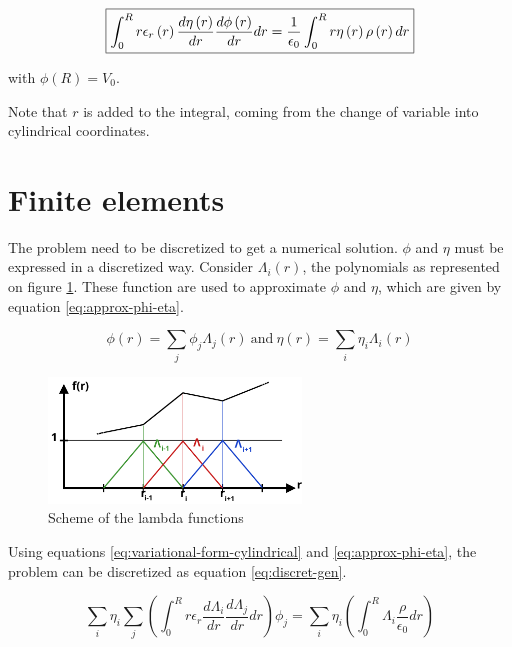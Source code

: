 \documentclass[a4paper,12pt,twoside]{article}
\newcommand{\bracket}[1]{\left(#1\right)}
\begin{document}
    \begin{equation}
      \centering
      \boxed{\int_0^R r\epsilon_r\bracket{r}\frac{d\eta\bracket{r}}{dr}\frac{d\phi\bracket{r}}{dr}dr = \frac{1}{\epsilon_0}\int_0^R r\eta\bracket{r}\rho\bracket{r} dr}
      \label{eq:variational-form-cylindrical}
    \end{equation}

    with $\phi\bracket{R} = V_0$.

    Note that $r$ is added to the integral, coming from the change of variable into cylindrical coordinates.

\section{Finite elements}
  The problem need to be discretized to get a numerical solution.
  $\phi$ and $\eta$ must be expressed in a discretized way.
  Consider $\Lambda_i\bracket{r}$, the polynomials as represented on figure \ref{fig:lambda}.
  These function are used to approximate $\phi$ and $\eta$, which are given by equation \eqref{eq:approx-phi-eta}.

  \begin{equation}
    \phi\bracket{r}=\sum_j\phi_j\Lambda_j\bracket{r}~\text{and}~\eta\bracket{r}=\sum_i\eta_i\Lambda_i\bracket{r}
    \label{eq:approx-phi-eta} %
  \end{equation}

  \begin{figure}[h]
    \centering
    \includegraphics[width=0.6\textwidth]{graphs/lambda.pdf}
    \caption{Scheme of the lambda functions}
    \label{fig:lambda}
  \end{figure}

  Using equations \eqref{eq:variational-form-cylindrical} and \eqref{eq:approx-phi-eta}, the problem can be discretized as equation \eqref{eq:discret-gen}.

  \begin{equation}
    \sum_i\eta_i\sum_j\bracket{\int_0^R r\epsilon_r\frac{d\Lambda_i}{dr}\frac{d\Lambda_j}{dr}dr}\phi_j = \sum_i\eta_i\bracket{\int_0^R\Lambda_i\frac{\rho}{\epsilon_0}dr}
    \label{eq:discret-gen}
  \end{equation}
\end{document}
